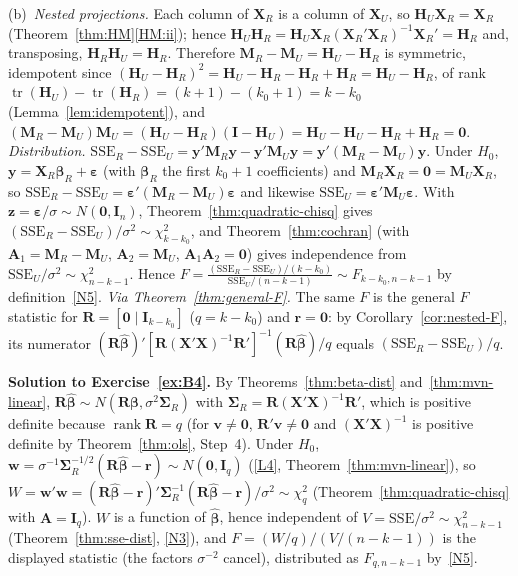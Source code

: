 \documentclass[12pt,a4paper]{article}
\theoremstyle{definition}
\DeclareMathOperator\tr{tr}
\DeclareMathOperator\rank{rank}
\newcommand{\SSE}{\mathrm{SSE}}
\newcommand{\bX}{\mathbf{X}}
\newcommand{\by}{\mathbf{y}}
\def\bb{\boldsymbol{\beta}}
\newcommand{\be}{\boldsymbol{\varepsilon}}
\newcommand{\bI}{\mathbf{I}}
\newcommand{\bH}{\mathbf{H}}
\newcommand{\bM}{\mathbf{M}}
\newcommand{\bR}{\mathbf{R}}
\newcommand{\br}{\mathbf{r}}
\newcommand{\bzero}{\mathbf{0}}
\newcommand{\bz}{\mathbf{z}}
\newcommand{\bw}{\mathbf{w}}
\newcommand{\bA}{\mathbf{A}}
\newcommand{\bv}{\mathbf{v}}
\begin{document}
(b)~\emph{Nested projections.} Each column of $\bX_R$ is a column of $\bX_U$, so $\bH_U\bX_R = \bX_R$ (Theorem~\ref{thm:HM}\ref{HM:ii}); hence $\bH_U\bH_R = \bH_U\bX_R(\bX_R'\bX_R)^{-1}\bX_R' = \bH_R$ and, transposing, $\bH_R\bH_U = \bH_R$. Therefore $\bM_R - \bM_U = \bH_U - \bH_R$ is symmetric, idempotent since $(\bH_U - \bH_R)^2 = \bH_U - \bH_R - \bH_R + \bH_R = \bH_U - \bH_R$, of rank $\tr(\bH_U) - \tr(\bH_R) = (k+1) - (k_0+1) = k - k_0$ (Lemma~\ref{lem:idempotent}), and $(\bM_R - \bM_U)\bM_U = (\bH_U - \bH_R)(\bI - \bH_U) = \bH_U - \bH_U - \bH_R + \bH_R = \bzero$. \emph{Distribution.} $\SSE_R - \SSE_U = \by'\bM_R\by - \by'\bM_U\by = \by'(\bM_R - \bM_U)\by$. Under $H_0$, $\by = \bX_R\bb_R + \be$ (with $\bb_R$ the first $k_0+1$ coefficients) and $\bM_R\bX_R = \bzero = \bM_U\bX_R$, so $\SSE_R - \SSE_U = \be'(\bM_R - \bM_U)\be$ and likewise $\SSE_U = \be'\bM_U\be$. With $\bz = \be/\sigma \sim N(\bzero, \bI_n)$, Theorem~\ref{thm:quadratic-chisq} gives $(\SSE_R - \SSE_U)/\sigma^2 \sim \chi^2_{k-k_0}$, and Theorem~\ref{thm:cochran} (with $\bA_1 = \bM_R - \bM_U$, $\bA_2 = \bM_U$, $\bA_1\bA_2 = \bzero$) gives independence from $\SSE_U/\sigma^2 \sim \chi^2_{n-k-1}$. Hence $F = \frac{(\SSE_R - \SSE_U)/(k-k_0)}{\SSE_U/(n-k-1)} \sim F_{k-k_0, n-k-1}$ by definition~\ref{N5}. \emph{Via Theorem~\ref{thm:general-F}.} The same $F$ is the general $F$ statistic for $\bR = [\bzero \mid \bI_{k-k_0}]$ ($q = k - k_0$) and $\br = \bzero$: by Corollary~\ref{cor:nested-F}, its numerator $(\bR\hat{\bb})'[\bR(\bX'\bX)^{-1}\bR']^{-1}(\bR\hat{\bb})/q$ equals $(\SSE_R - \SSE_U)/q$.

\textbf{Solution to Exercise~\ref{ex:B4}.} By Theorems~\ref{thm:beta-dist} and~\ref{thm:mvn-linear}, $\bR\hat{\bb} \sim N(\bR\bb, \sigma^2\boldsymbol\Sigma_R)$ with $\boldsymbol\Sigma_R = \bR(\bX'\bX)^{-1}\bR'$, which is positive definite because $\rank\bR = q$ (for $\bv \neq \bzero$, $\bR'\bv \neq \bzero$ and $(\bX'\bX)^{-1}$ is positive definite by Theorem~\ref{thm:ols}, Step~4). Under $H_0$, $\bw = \sigma^{-1}\boldsymbol\Sigma_R^{-1/2}(\bR\hat{\bb} - \br) \sim N(\bzero, \bI_q)$ (\ref{L4}, Theorem~\ref{thm:mvn-linear}), so $W = \bw'\bw = (\bR\hat{\bb} - \br)'\boldsymbol\Sigma_R^{-1}(\bR\hat{\bb} - \br)/\sigma^2 \sim \chi^2_q$ (Theorem~\ref{thm:quadratic-chisq} with $\bA = \bI_q$). $W$ is a function of $\hat{\bb}$, hence independent of $V = \SSE/\sigma^2 \sim \chi^2_{n-k-1}$ (Theorem~\ref{thm:sse-dist}, \ref{N3}), and $F = (W/q)/(V/(n-k-1))$ is the displayed statistic (the factors $\sigma^{-2}$ cancel), distributed as $F_{q,n-k-1}$ by~\ref{N5}.
\end{document}
